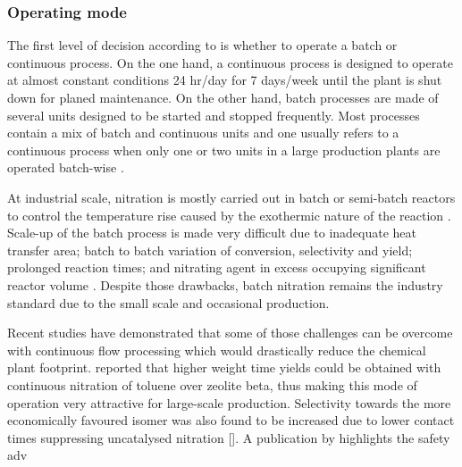 \subsubsection{Operating mode} %
The first level of decision according to \textcite{douglas_conceptual_1988} is whether to operate a batch or continuous process. On the one hand, a continuous process is designed to operate at almost constant conditions 24 hr/day for 7 days/week until the plant is shut down for planed maintenance. On the other hand, batch processes are made of several units designed to be started and stopped frequently. Most processes contain a mix of batch and continuous units and one usually refers to a continuous process when only one or two units in a large production plants are operated batch-wise \cite{douglas_conceptual_1988}. 

At industrial scale, nitration is mostly carried out in batch or semi-batch reactors to control the temperature rise caused by the exothermic nature of the reaction \cite{booth_nitro_2000,dugal_nitrobenzene_2005}. Scale-up of the batch process is made very difficult due to inadequate heat transfer area; batch to batch variation of conversion, selectivity and yield; prolonged reaction times; and nitrating agent in excess occupying significant reactor volume \cite{kulkarni_continuous_2014}. Despite those drawbacks, batch nitration remains the industry standard due to the small scale and occasional production. 

Recent studies have demonstrated that some of those challenges can be overcome with continuous flow processing which would drastically reduce the chemical plant footprint. \textcite{} reported that higher weight time yields could be obtained with continuous nitration of toluene over zeolite beta, thus making this mode of operation very attractive for large-scale production. Selectivity towards the more economically favoured \para isomer was also found to be increased due to lower contact times suppressing uncatalysed nitration []. A publication by \textcite{di_miceli_raimondi_safety_2015} highlights the safety adv







